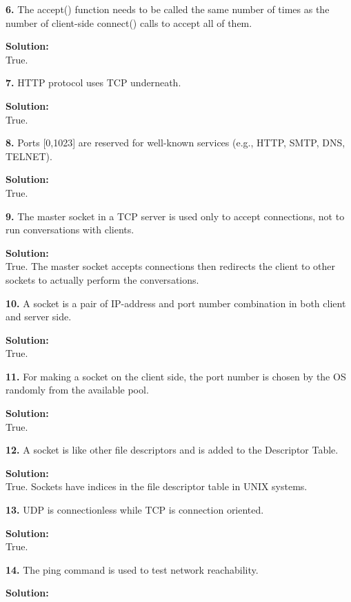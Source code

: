 \documentclass[12pt]{article}
\begin{document}
{\bf 6.} The accept() function needs to be called the same number of times as the number of client-side connect() calls to accept all of them. 

{\bf Solution:}\\

True. 

{\bf 7.} HTTP protocol uses TCP underneath.

{\bf Solution:}\\

True.

{\bf 8.} Ports [0,1023] are reserved for well-known services (e.g., HTTP, SMTP, DNS, TELNET).

{\bf Solution:}\\

True. 

{\bf 9.} The master socket in a TCP server is used only to accept connections, not to run conversations with clients. 

{\bf Solution:}\\

True. The master socket accepts connections then redirects the client to other sockets to actually perform the conversations. 

{\bf 10.} A socket is a pair of IP-address and port number combination in both client and server side. 

{\bf Solution:}\\

True. 

{\bf 11.} For making a socket on the client side, the port number is chosen by the OS randomly from the available pool.

{\bf Solution:}\\

True. 

{\bf 12.} A socket is like other file descriptors and is added to the Descriptor Table. 

{\bf Solution:}\\

True. Sockets have indices in the file descriptor table in UNIX systems. 

{\bf 13.} UDP is connectionless while TCP is connection oriented. 

{\bf Solution:}\\

True. 

{\bf 14.} The ping command is used to test network reachability.

{\bf Solution:}\\
\end{document}
